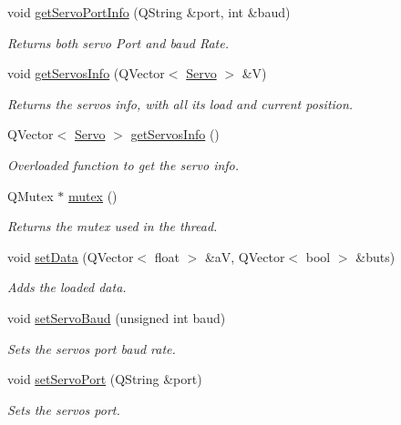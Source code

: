\begin{DoxyCompactItemize}
void \hyperlink{a00007_afcf834d93f1ac9663d6ebaab820e5f74}{get\+Servo\+Port\+Info} (Q\+String \&port, int \&baud)
\begin{DoxyCompactList}\small\item\em Returns both servo Port and baud Rate. \end{DoxyCompactList}\item 
void \hyperlink{a00007_a5fd8ef13314428f5ba7646730cc58f1c}{get\+Servos\+Info} (Q\+Vector$<$ \hyperlink{a00006}{Servo} $>$ \&V)
\begin{DoxyCompactList}\small\item\em Returns the servos info, with all its load and current position. \end{DoxyCompactList}\item 
Q\+Vector$<$ \hyperlink{a00006}{Servo} $>$ \hyperlink{a00007_a3d58189cdeddfb828856f192607f68d2}{get\+Servos\+Info} ()
\begin{DoxyCompactList}\small\item\em Overloaded function to get the servo info. \end{DoxyCompactList}\item 
Q\+Mutex $\ast$ \hyperlink{a00007_a82d074ab2c445470a6f49e2935bf6a8e}{mutex} ()
\begin{DoxyCompactList}\small\item\em Returns the mutex used in the thread. \end{DoxyCompactList}\item 
void \hyperlink{a00007_a8497ea56991b620981ce1fbf53d9ebdb}{set\+Data} (Q\+Vector$<$ float $>$ \&a\+V, Q\+Vector$<$ bool $>$ \&buts)
\begin{DoxyCompactList}\small\item\em Adds the loaded data. \end{DoxyCompactList}\item 
void \hyperlink{a00007_a009d3d1b99007b14fadb49996fac49d6}{set\+Servo\+Baud} (unsigned int baud)
\begin{DoxyCompactList}\small\item\em Sets the servos port baud rate. \end{DoxyCompactList}\item 
void \hyperlink{a00007_a144e31105019d833f59ca2eba012e638}{set\+Servo\+Port} (Q\+String \&port)
\begin{DoxyCompactList}\small\item\em Sets the servos port. \end{DoxyCompactList}\item 

\end{DoxyCompactItemize}
